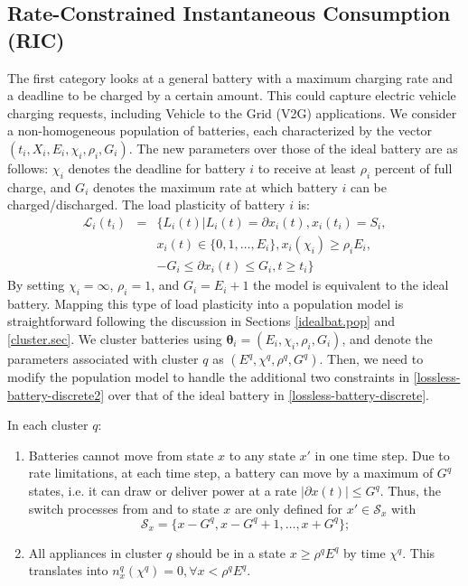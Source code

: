 \documentclass[10pt]{IEEEtran}
\begin{document}
\subsection{Rate-Constrained Instantaneous Consumption (RIC)} \label{cat1}
The first category looks at a general battery with a maximum charging rate and a deadline to be charged by a certain amount. This could capture electric vehicle charging requests, including Vehicle to the Grid (V2G) applications. We consider a non-homogeneous population of batteries, each characterized by the vector $(t_i, X_i , E_i, \chi_i, \rho_i, G_i)$. The new parameters over those of the ideal battery are as follows: $\chi_i$   denotes the deadline for battery $i$ to receive at least $\rho_i$ percent of full charge, and $G_i$ denotes the maximum rate at which battery $i$ can be charged/discharged. The load plasticity of battery $i$ is:
  \begin{eqnarray}\nonumber
{\mathcal L}_i(t_i)&=&\{L_i(t) |  L_i(t) = \partial x_i(t), x_i(t_i) = S_i, \\
				& &x_i(t) \in \{0,1,\ldots, E_i\}, x_i(\chi_i) \geq \rho_i E_i, \nonumber \\
& & -G_i \leq \partial x_i(t) \leq G_i, t\geq t_i \}  \label{lossless-battery-discrete2}
\end{eqnarray}
By setting $\chi_i = \infty$, $\rho_i = 1$, and $G_i = E_i + 1$ the model is equivalent to the ideal battery.
Mapping this type of load plasticity into a population model is straightforward following the discussion in Sections \ref{idealbat.pop} and \ref{cluster.sec}. We cluster batteries using $\boldsymbol{\theta}_i = (E_i, \chi_i, \rho_i, G_i)$, and denote the parameters associated with cluster $q$ as $(E^q, \chi^q, \rho^q, G^q)$. Then, we need to modify the population model to handle the additional two constraints in \eqref{lossless-battery-discrete2} over that of the ideal battery in \eqref{lossless-battery-discrete}.

In each cluster $q$:
\begin{enumerate}
\item Batteries cannot move from state $x$ to any state $x'$ in one time step. Due to rate limitations, at each time step, a battery can move by a maximum of $G^q$ states, i.e. it can draw or deliver power at a rate $|\partial x(t)|\leq G^q$. Thus, the switch processes from and to state $x$ are only defined for $x' \in {\mathcal S}_x$ with 
\begin{equation}
{\mathcal S}_x =\{x - G^q, x - G^q+1, \ldots, x + G^q\};
\end{equation}
\item All appliances in cluster $q$ should be in a state $x \geq \rho^q E^q$ by time $\chi^q$. This translates into $n_x^q(\chi^q) = 0, \forall x < \rho^q E^q$.
\end{enumerate}
\end{document}

